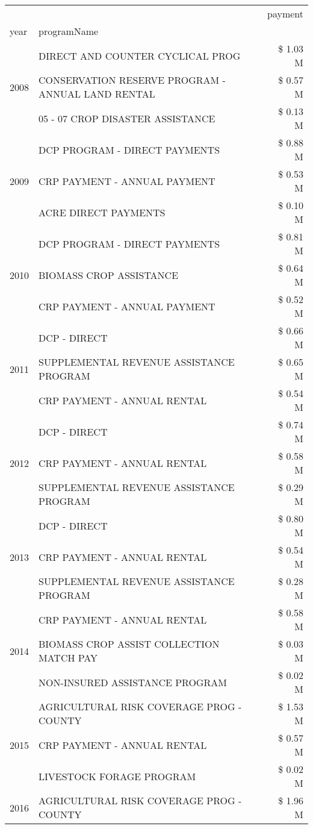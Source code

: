 \begin{tabular}{llr}
\toprule
 &  & payment \\
year & programName &  \\
\midrule
\multirow[t]{3}{*}{2008} & DIRECT AND COUNTER CYCLICAL PROG & \$ 1.03 M \\
 & CONSERVATION RESERVE PROGRAM - ANNUAL LAND RENTAL & \$ 0.57 M \\
 & 05 - 07 CROP DISASTER ASSISTANCE & \$ 0.13 M \\
\cline{1-3}
\multirow[t]{3}{*}{2009} & DCP PROGRAM - DIRECT PAYMENTS & \$ 0.88 M \\
 & CRP PAYMENT - ANNUAL PAYMENT & \$ 0.53 M \\
 & ACRE DIRECT PAYMENTS & \$ 0.10 M \\
\cline{1-3}
\multirow[t]{3}{*}{2010} & DCP PROGRAM - DIRECT PAYMENTS & \$ 0.81 M \\
 & BIOMASS CROP ASSISTANCE & \$ 0.64 M \\
 & CRP PAYMENT - ANNUAL PAYMENT & \$ 0.52 M \\
\cline{1-3}
\multirow[t]{3}{*}{2011} & DCP - DIRECT & \$ 0.66 M \\
 & SUPPLEMENTAL REVENUE ASSISTANCE PROGRAM & \$ 0.65 M \\
 & CRP PAYMENT - ANNUAL RENTAL & \$ 0.54 M \\
\cline{1-3}
\multirow[t]{3}{*}{2012} & DCP - DIRECT & \$ 0.74 M \\
 & CRP PAYMENT - ANNUAL RENTAL & \$ 0.58 M \\
 & SUPPLEMENTAL REVENUE ASSISTANCE PROGRAM & \$ 0.29 M \\
\cline{1-3}
\multirow[t]{3}{*}{2013} & DCP - DIRECT & \$ 0.80 M \\
 & CRP PAYMENT - ANNUAL RENTAL & \$ 0.54 M \\
 & SUPPLEMENTAL REVENUE ASSISTANCE PROGRAM & \$ 0.28 M \\
\cline{1-3}
\multirow[t]{3}{*}{2014} & CRP PAYMENT - ANNUAL RENTAL & \$ 0.58 M \\
 & BIOMASS CROP ASSIST COLLECTION MATCH PAY & \$ 0.03 M \\
 & NON-INSURED ASSISTANCE PROGRAM & \$ 0.02 M \\
\cline{1-3}
\multirow[t]{3}{*}{2015} & AGRICULTURAL RISK COVERAGE PROG - COUNTY & \$ 1.53 M \\
 & CRP PAYMENT - ANNUAL RENTAL & \$ 0.57 M \\
 & LIVESTOCK FORAGE PROGRAM & \$ 0.02 M \\
\cline{1-3}
\multirow[t]{3}{*}{2016} & AGRICULTURAL RISK COVERAGE PROG - COUNTY      & \$ 1.96 M \\

\end{tabular}
